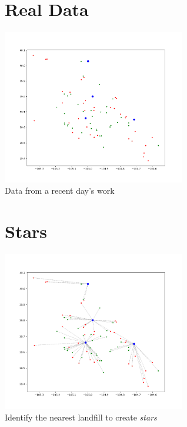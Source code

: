 \documentclass{beamer}
\begin{document}
\section{Real Data}
\begin{frame}
	\begin{center}
		\includegraphics[width=8cm]{empty.png}\\
		Data from a recent day's work
	\end{center}
\end{frame}

\section{Stars}
\begin{frame}
	\begin{center}
		\includegraphics[width=8cm]{stars.png}\\
		Identify the nearest landfill to create \emph{stars}
	\end{center}
\end{frame}
\end{document}
